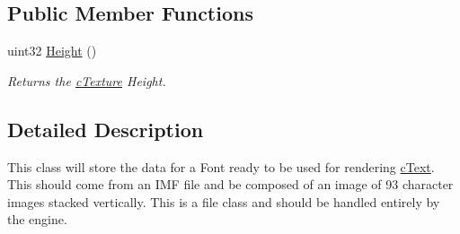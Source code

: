 \subsection*{Public Member Functions}
\begin{DoxyCompactItemize}
\item 
\hypertarget{classc_font_a3fa379c0126af4edd8c4f7bb39507a13}{
uint32 \hyperlink{classc_font_a3fa379c0126af4edd8c4f7bb39507a13}{Height} ()}
\label{classc_font_a3fa379c0126af4edd8c4f7bb39507a13}

\begin{DoxyCompactList}\small\item\em Returns the \hyperlink{classc_texture}{cTexture} Height. \end{DoxyCompactList}\end{DoxyCompactItemize}


\subsection{Detailed Description}
This class will store the data for a Font ready to be used for rendering \hyperlink{classc_text}{cText}. This should come from an IMF file and be composed of an image of 93 character images stacked vertically. This is a file class and should be handled entirely by the engine. 